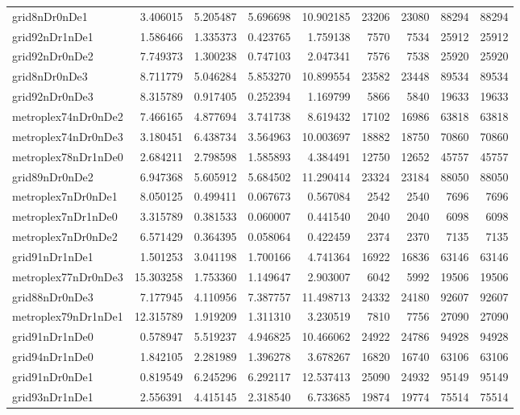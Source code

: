 \begin{longtable}{|l|r|r|r|r|r|r|r|r|}
grid8nDr0nDe1 & 3.406015 & 5.205487 & 5.696698 & 10.902185 & 23206 & 23080 & 88294 & 88294 \\
grid92nDr1nDe1 & 1.586466 & 1.335373 & 0.423765 & 1.759138 & 7570 & 7534 & 25912 & 25912 \\
grid92nDr0nDe2 & 7.749373 & 1.300238 & 0.747103 & 2.047341 & 7576 & 7538 & 25920 & 25920 \\
grid8nDr0nDe3 & 8.711779 & 5.046284 & 5.853270 & 10.899554 & 23582 & 23448 & 89534 & 89534 \\
grid92nDr0nDe3 & 8.315789 & 0.917405 & 0.252394 & 1.169799 & 5866 & 5840 & 19633 & 19633 \\
metroplex74nDr0nDe2 & 7.466165 & 4.877694 & 3.741738 & 8.619432 & 17102 & 16986 & 63818 & 63818 \\
metroplex74nDr0nDe3 & 3.180451 & 6.438734 & 3.564963 & 10.003697 & 18882 & 18750 & 70860 & 70860 \\
metroplex78nDr1nDe0 & 2.684211 & 2.798598 & 1.585893 & 4.384491 & 12750 & 12652 & 45757 & 45757 \\
grid89nDr0nDe2 & 6.947368 & 5.605912 & 5.684502 & 11.290414 & 23324 & 23184 & 88050 & 88050 \\
metroplex7nDr0nDe1 & 8.050125 & 0.499411 & 0.067673 & 0.567084 & 2542 & 2540 & 7696 & 7696 \\
metroplex7nDr1nDe0 & 3.315789 & 0.381533 & 0.060007 & 0.441540 & 2040 & 2040 & 6098 & 6098 \\
metroplex7nDr0nDe2 & 6.571429 & 0.364395 & 0.058064 & 0.422459 & 2374 & 2370 & 7135 & 7135 \\
grid91nDr1nDe1 & 1.501253 & 3.041198 & 1.700166 & 4.741364 & 16922 & 16836 & 63146 & 63146 \\
metroplex77nDr0nDe3 & 15.303258 & 1.753360 & 1.149647 & 2.903007 & 6042 & 5992 & 19506 & 19506 \\
grid88nDr0nDe3 & 7.177945 & 4.110956 & 7.387757 & 11.498713 & 24332 & 24180 & 92607 & 92607 \\
metroplex79nDr1nDe1 & 12.315789 & 1.919209 & 1.311310 & 3.230519 & 7810 & 7756 & 27090 & 27090 \\
grid91nDr1nDe0 & 0.578947 & 5.519237 & 4.946825 & 10.466062 & 24922 & 24786 & 94928 & 94928 \\
grid94nDr1nDe0 & 1.842105 & 2.281989 & 1.396278 & 3.678267 & 16820 & 16740 & 63106 & 63106 \\
grid91nDr0nDe1 & 0.819549 & 6.245296 & 6.292117 & 12.537413 & 25090 & 24932 & 95149 & 95149 \\
grid93nDr1nDe1 & 2.556391 & 4.415145 & 2.318540 & 6.733685 & 19874 & 19774 & 75514 & 75514 \\

\end{longtable}
